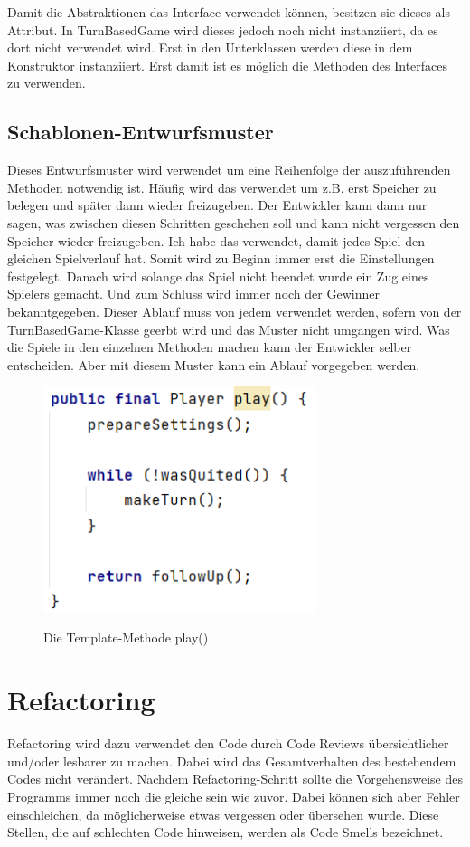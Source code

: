 \documentclass[12pt]{article}
\begin{document}
Damit die Abstraktionen das Interface verwendet können, besitzen sie dieses als Attribut. In TurnBasedGame wird dieses jedoch noch nicht instanziiert, da es dort nicht verwendet wird. Erst in den Unterklassen werden diese in dem Konstruktor instanziiert. Erst damit ist es möglich die Methoden des Interfaces zu verwenden.



\subsection{Schablonen-Entwurfsmuster}
Dieses Entwurfsmuster wird verwendet um eine Reihenfolge der auszuführenden Methoden notwendig ist. Häufig wird das verwendet um z.B. erst Speicher zu belegen und später dann wieder freizugeben. Der Entwickler kann dann nur sagen, was zwischen diesen Schritten geschehen soll und kann nicht vergessen den Speicher wieder freizugeben. 
Ich habe das verwendet, damit jedes Spiel den gleichen Spielverlauf hat. Somit wird zu Beginn immer erst die Einstellungen festgelegt. Danach wird solange das Spiel nicht beendet wurde ein Zug eines Spielers gemacht. Und zum Schluss wird immer noch der Gewinner bekanntgegeben. Dieser Ablauf muss von jedem verwendet werden, sofern von der TurnBasedGame-Klasse geerbt wird und das Muster nicht umgangen wird. Was die Spiele in den einzelnen Methoden machen kann der Entwickler selber entscheiden. Aber mit diesem Muster kann ein Ablauf vorgegeben werden.

\begin{figure}[H]
\centering
{\includegraphics[width=8cm]{Bilder/templatePattern}}
\caption{Die Template-Methode play()}
\label{fig:templatePattern}
\end{figure}




\newpage
\section{Refactoring}
Refactoring wird dazu verwendet den Code durch Code Reviews übersichtlicher und/oder lesbarer zu machen. Dabei wird das Gesamtverhalten des bestehendem Codes nicht verändert. Nachdem Refactoring-Schritt sollte die Vorgehensweise des Programms immer noch die gleiche sein wie zuvor. Dabei können sich aber Fehler einschleichen, da möglicherweise etwas vergessen oder übersehen wurde.
Diese Stellen, die auf \glqq schlechten \grqq Code hinweisen, werden als Code Smells bezeichnet.
\end{document}
